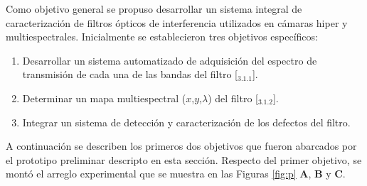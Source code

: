 Como objetivo general se propuso desarrollar un sistema integral de caracterización de filtros ópticos de interferencia utilizados en cámaras hiper y multiespectrales. Inicialmente se establecieron tres objetivos específicos:
\begin{enumerate}
\item Desarrollar un sistema automatizado de adquisición del espectro de transmisión de cada una de las bandas del filtro [\href{https://github.com/jrr1984/Prototipo0\_S-D\_SpectralGUI/blob/master/barrido/std}{\faGithub$_{3.1.1}$}].

\item Determinar un mapa multiespectral ($\textit{x}$,$\textit{y}$,$\lambda$) del filtro [\href{https://github.com/jrr1984/Prototipo0\_S-D\_SpectralGUI/blob/master/spectral\_gui/main.py}{\faGithub$_{3.1.2}$}].

\item Integrar un sistema de detección y caracterización de los defectos del filtro.
\end{enumerate}

A continuación se describen los primeros dos objetivos que fueron abarcados por el prototipo preliminar descripto en esta sección. Respecto del primer objetivo, se montó el arreglo experimental que se muestra en las Figuras \ref{fig:p} \textbf{A}, \textbf{B} y \textbf{C}. 

